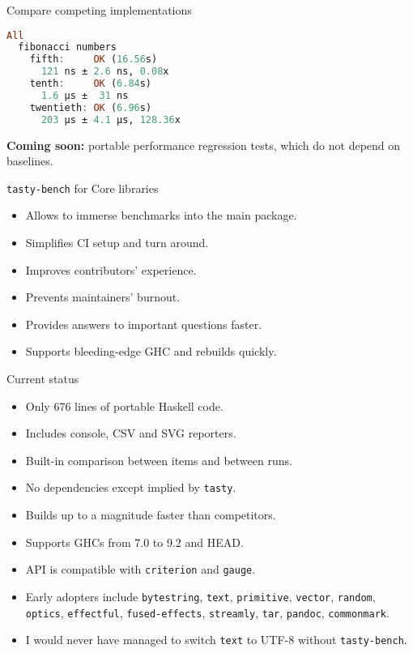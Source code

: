 \documentclass[handout]{beamer}
\begin{document}
\begin{frame}[fragile]{Compare competing implementations}

\begin{lstlisting}[language=Haskell]
All
  fibonacci numbers
    fifth:     OK (16.56s)
      121 ns ± 2.6 ns, 0.08x
    tenth:     OK (6.84s)
      1.6 μs ±  31 ns
    twentieth: OK (6.96s)
      203 μs ± 4.1 μs, 128.36x
\end{lstlisting}

\pause\bigskip

{\bf Coming soon:} portable performance regression tests, which do not depend on baselines.

\end{frame}

\begin{frame}{{\tt tasty-bench} for Core libraries}

\begin{itemize}[<+->]
\item Allows to immerse benchmarks into the main package.
\item Simplifies CI setup and turn around.
\item Improves contributors' experience.
\item Prevents maintainers' burnout.
\item Provides answers to important questions faster.
\item Supports bleeding-edge GHC and rebuilds quickly.
\end{itemize}

\end{frame}

\begin{frame}{Current status}

\begin{itemize}[<+->]
\item Only 676 lines of portable Haskell code.
\item Includes console, CSV and SVG reporters.
\item Built-in comparison between items and between runs.
\item No dependencies except implied by {\tt tasty}.
\item Builds up to a magnitude faster than competitors.
\item Supports GHCs from 7.0 to 9.2 and HEAD.
\item API is compatible with {\tt criterion} and {\tt gauge}.
\item Early adopters include
      {\tt bytestring}, {\tt text}, {\tt primitive}, {\tt vector}, {\tt random},
      {\tt optics}, {\tt effectful}, {\tt fused-effects},
      {\tt streamly}, {\tt tar}, {\tt pandoc}, {\tt commonmark}.
\item I would never have managed to switch {\tt text} to UTF-8 without {\tt tasty-bench}.
\end{itemize}

\end{frame}
\end{document}
